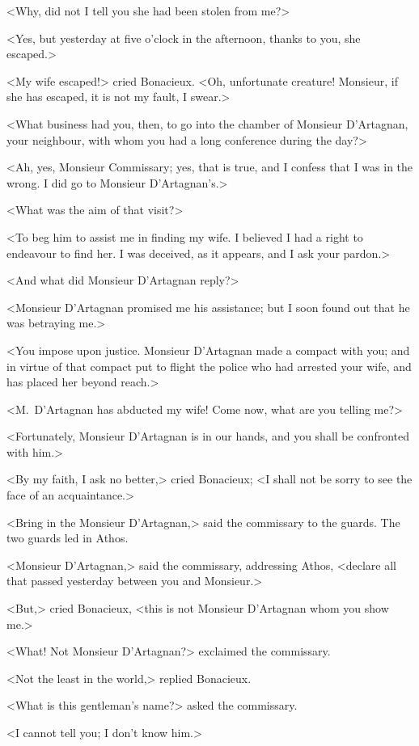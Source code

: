 <Why, did not I tell you she had been stolen from me?> 

<Yes, but yesterday at five o'clock in the afternoon, thanks to you, she escaped.> 

<My wife escaped!> cried Bonacieux. <Oh, unfortunate creature! Monsieur, if she has escaped, it is not my fault, I swear.> 

<What business had you, then, to go into the chamber of Monsieur D'Artagnan, your neighbour, with whom you had a long conference during the day?> 

<Ah, yes, Monsieur Commissary; yes, that is true, and I confess that I was in the wrong. I did go to Monsieur D'Artagnan's.> 

<What was the aim of that visit?> 

<To beg him to assist me in finding my wife. I believed I had a right to endeavour to find her. I was deceived, as it appears, and I ask your pardon.> 

<And what did Monsieur D'Artagnan reply?> 

<Monsieur D'Artagnan promised me his assistance; but I soon found out that he was betraying me.> 

<You impose upon justice. Monsieur D'Artagnan made a compact with you; and in virtue of that compact put to flight the police who had arrested your wife, and has placed her beyond reach.> 

<M.~D'Artagnan has abducted my wife! Come now, what are you telling me?> 

<Fortunately, Monsieur D'Artagnan is in our hands, and you shall be confronted with him.> 

<By my faith, I ask no better,> cried Bonacieux; <I shall not be sorry to see the face of an acquaintance.> 

<Bring in the Monsieur D'Artagnan,> said the commissary to the guards. The two guards led in Athos. 

<Monsieur D'Artagnan,> said the commissary, addressing Athos, <declare all that passed yesterday between you and Monsieur.> 

<But,> cried Bonacieux, <this is not Monsieur D'Artagnan whom you show me.> 

<What! Not Monsieur D'Artagnan?> exclaimed the commissary. 

<Not the least in the world,> replied Bonacieux. 

<What is this gentleman's name?> asked the commissary. 

<I cannot tell you; I don't know him.> 

